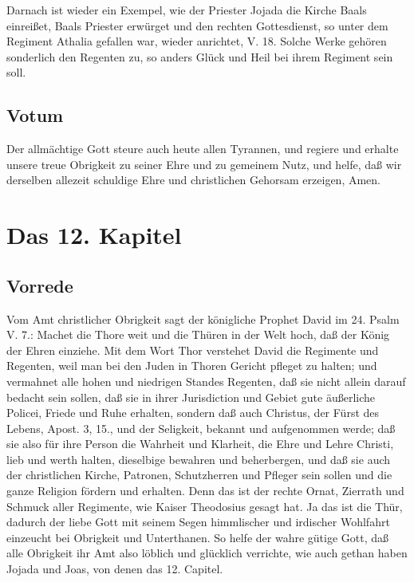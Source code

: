 Darnach ist wieder ein Exempel, wie der Priester Jojada die Kirche Baals einreißet, Baals Priester erwürget und den rechten Gottesdienst, so unter dem Regiment Athalia gefallen war, wieder anrichtet, V. 18. Solche Werke gehören sonderlich den Regenten zu, so anders Glück und Heil bei ihrem Regiment sein soll.

\section{Votum}

Der allmächtige Gott steure auch heute allen Tyrannen, und regiere und erhalte unsere treue Obrigkeit zu seiner Ehre und zu gemeinem Nutz, und helfe, daß wir derselben allezeit schuldige Ehre und christlichen Gehorsam erzeigen, Amen.

\chapter{Das 12. Kapitel}

\section{Vorrede}

Vom Amt christlicher Obrigkeit sagt der königliche Prophet David im 24. Psalm V. 7.: Machet die Thore weit und die Thüren in der Welt hoch, daß der König der Ehren einziehe. Mit dem Wort Thor verstehet David die Regimente und Regenten, weil man bei den Juden in Thoren Gericht pfleget zu halten; und vermahnet alle hohen und niedrigen Standes Regenten, daß sie nicht allein darauf bedacht sein sollen, daß sie in ihrer Jurisdiction und Gebiet gute äußerliche Policei, Friede und Ruhe erhalten, sondern daß auch Christus, der Fürst des Lebens, Apost. 3, 15., und der Seligkeit, bekannt und aufgenommen werde; daß sie also für ihre Person die Wahrheit und Klarheit, die Ehre und Lehre Christi, lieb und werth halten, dieselbige bewahren und beherbergen, und daß sie auch der christlichen Kirche, Patronen, Schutzherren und Pfleger sein sollen und die ganze Religion fördern und erhalten. Denn das ist der rechte Ornat, Zierrath und Schmuck aller Regimente, wie Kaiser Theodosius gesagt hat. Ja das ist die Thür, dadurch der liebe Gott mit seinem Segen himmlischer und irdischer Wohlfahrt einzeucht bei Obrigkeit und Unterthanen. So helfe der wahre gütige Gott, daß alle Obrigkeit ihr Amt also löblich und glücklich verrichte, wie auch gethan haben Jojada und Joas, von denen das 12. Capitel.

